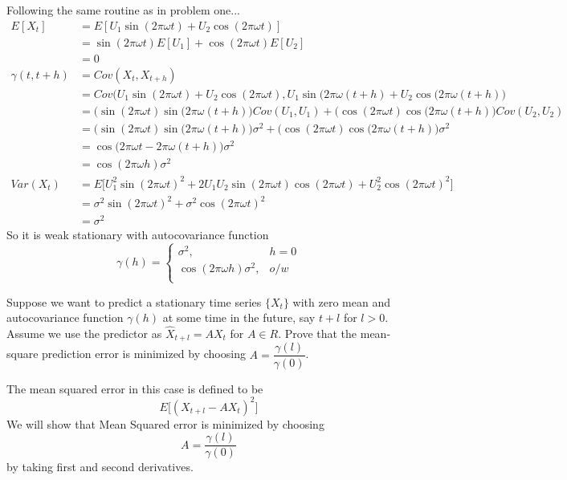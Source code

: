 \documentclass[10pt,a4paper]{exam}
\begin{document}
\begin{questions}
\begin{solution}
Following the same routine as in problem one...
\begin{align*}
E[X_t]	&= E[U_1\sin(2\pi \omega t) + U_2 \cos(2\pi\omega t)]\\
			&= \sin(2\pi \omega t)E[U_1] + \cos(2\pi\omega t)E[U_2]\\
			&= 0\\
\gamma(t, t+h)		&= Cov(X_t, X_{t+h})\\
							&= Cov\Big(U_1\sin(2\pi \omega t) + U_2 \cos(2\pi\omega t), U_1\sin(2\pi \omega(t + h) + U_2 \cos(2\pi\omega (t+h)\Big)\\
							&= \Big(\sin(2\pi\omega t)\sin(2\pi\omega (t + h)\Big)Cov(U_1,U_1) + \Big(\cos(2\pi\omega t)\cos(2\pi\omega (t + h)\Big)Cov(U_2,U_2) \\
							&= \Big(\sin(2\pi\omega t)\sin(2\pi\omega (t + h)\Big)\sigma^2 + \Big(\cos(2\pi\omega t)\cos(2\pi\omega (t + h)\Big)\sigma^2 \\
							&= \cos\Big(2\pi\omega t - 2\pi\omega(t + h)\Big)\sigma^2\\
							&= \cos(2\pi\omega h)\sigma^2\\
Var(X_t)		&= E\Big[U_1^2 \sin(2\pi\omega t)^2 + 2U_1U_2\sin(2\pi\omega t)\cos(2\pi\omega t) + U_2^2 \cos(2\pi\omega t)^2\Big]\\
					&= \sigma^2\sin(2\pi\omega t)^2 + \sigma^2 \cos(2\pi\omega t)^2\\
					&= \sigma^2
\end{align*}
So it is weak stationary with autocovariance function
$$\gamma(h) 	= \begin{cases}
\sigma^2, & h = 0\\
\cos(2\pi\omega h)\sigma^2, & o/w\\
\end{cases}$$
\end{solution}
\pagebreak
\question Suppose we want to predict a stationary time series $\{X_t\}$ with zero mean and autocovariance function $\gamma(h)$ at some time in the future, say $t + l$ for $l > 0$. Assume we use the predictor as $\hat{X}_{t+l} = AX_t$ for $A \in R$. Prove that the mean-square prediction error is minimized by choosing $A = \dfrac{\gamma(l)}{\gamma(0)}$.

\begin{solution}
The mean squared error in this case is defined to be 
$$E\Big[(X_{t+l} - AX_t)^2\Big]$$
We will show that Mean Squared error is minimized by choosing
$$A = \frac{\gamma(l)}{\gamma(0)}$$ by taking first and second derivatives.


\end{solution}
\end{questions}
\end{document}

